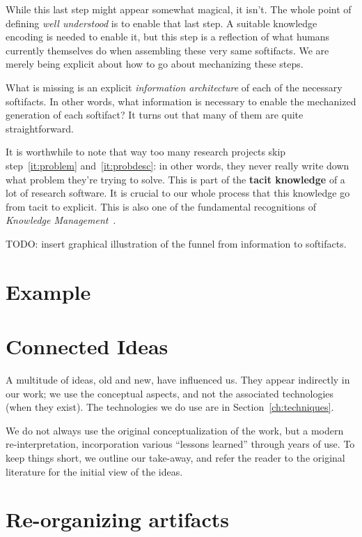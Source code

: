 \documentclass[sigconf,review]{acmart}
\begin{document}
While this last step might appear somewhat magical, it isn't. The whole
point of defining \emph{well understood} is to enable that last step. A
suitable knowledge encoding is needed to enable it, but this step is a
reflection of what humans currently themselves do when assembling these very
same softifacts. We are merely being explicit about how to go about
mechanizing these steps.

What is missing is an explicit \emph{information architecture} of each of
the necessary softifacts. In other words, what information is necessary to
enable the mechanized generation of each softifact? It turns out that many
of them are quite straightforward.

It is worthwhile to note that way too many research projects skip
step~\ref{it:problem} and~\ref{it:probdesc}: in other words, they never really
write down what problem they're trying to solve. This is part of the
\textbf{tacit knowledge} of a lot of research software.  It is crucial to our
whole process that this knowledge go from tacit to explicit. This is also one
of the fundamental recognitions of \emph{Knowledge
Management}~\cite{KM-textbook}.

TODO: insert graphical illustration of the funnel from information to
softifacts.

\section{Example}\label{ch:example}

\section{Connected Ideas}\label{ch:ideas}

A multitude of ideas, old and new, have influenced us. They appear
indirectly in our work; we use the conceptual aspects, and not the
associated technologies (when they exist). The technologies we do use
are in Section~\ref{ch:techniques}.

We do not always use the original conceptualization of the work, but
a modern re-interpretation, incorporation various ``lessons learned''
through years of use. To keep things short, we outline our take-away, and refer
the reader to the original literature for the initial view of the ideas.

\section{Re-organizing artifacts}
\end{document}
